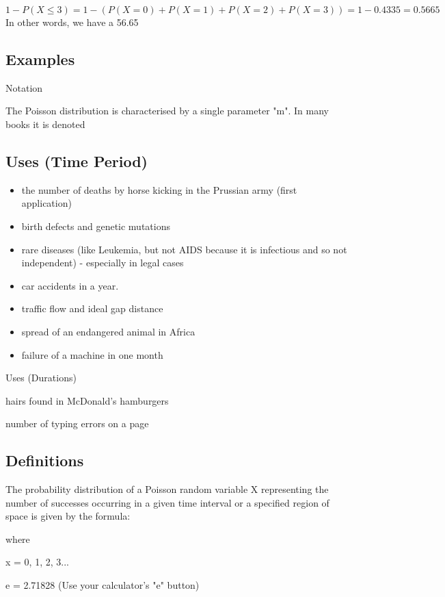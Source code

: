 \[1 - P(X\leq3) = 1 - ( P(X=0) + P(X=1) + P(X=2) + P(X=3) ) = 1 - 0.4335 = 0.5665\]
In other words, we have a 56.65%



\subsection*{Examples}

Notation 

The Poisson distribution is characterised by a single parameter "m".
In many books it is denoted 


\subsection{Uses (Time Period)}
\begin{itemize}
\item the number of deaths by horse kicking in the Prussian army (first application)
\item birth defects and genetic mutations
\item rare diseases (like Leukemia, but not AIDS because it is infectious and so not independent) - especially in legal cases
\item car accidents in a year.
\item traffic flow and ideal gap distance
\item spread of an endangered animal in Africa
\item failure of a machine in one month
\end{itemize}

Uses (Durations)

hairs found in McDonald's hamburgers

number of typing errors on a page

\subsection{Definitions}

The probability distribution of a Poisson random variable X representing the number of successes occurring in a given time interval or a specified region of space is given by the formula:

where

x = 0, 1, 2, 3...

e = 2.71828 (Use your calculator's "e" button)


